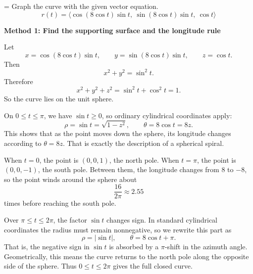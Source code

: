 \documentclass[a4paper,12pt,twocolumn]{article}
\newlength{\problemnumberwidth}
\newenvironment{solutionbox}{\begin{framed}}{\end{framed}}
\newcommand{\problem}[3]{%
  \Needspace{10\baselineskip}%
  \phantomsection\label{#1}%
  \par\vspace{0.8em}%
  \noindent
  \hangindent=\problemnumberwidth
  \hangafter=1
  \makebox[\problemnumberwidth][l]{\textbf{#2.}}#3\par
}
\begin{document}
\problem{prob:13-1-44}{44}{Graph the curve with the given vector equation.
\[
r(t)=\langle \cos(8\cos t)\sin t,\ \sin(8\cos t)\sin t,\ \cos t\rangle
\]}

\begin{solutionbox}
\textbf{Method 1: Find the supporting surface and the longitude rule}

\begin{steps}
\item Let
\[
x=\cos(8\cos t)\sin t,\qquad
y=\sin(8\cos t)\sin t,\qquad
z=\cos t.
\]
Then
\[
x^2+y^2=\sin^2 t.
\]
Therefore
\[
x^2+y^2+z^2=\sin^2 t+\cos^2 t=1.
\]
So the curve lies on the unit sphere.

\item On \(0\le t\le \pi\), we have \(\sin t\ge 0\), so ordinary cylindrical coordinates apply:
\[
\rho=\sin t=\sqrt{1-z^2},
\qquad
\theta=8\cos t=8z.
\]
This shows that as the point moves down the sphere, its longitude changes according to \(\theta=8z\). That is exactly the description of a spherical spiral.

\item When \(t=0\), the point is \((0,0,1)\), the north pole. When \(t=\pi\), the point is \((0,0,-1)\), the south pole. Between them, the longitude changes from \(8\) to \(-8\), so the point winds around the sphere about
\[
\frac{16}{2\pi}\approx 2.55
\]
times before reaching the south pole.

\item Over \(\pi\le t\le 2\pi\), the factor \(\sin t\) changes sign. In standard cylindrical coordinates the radius must remain nonnegative, so we rewrite this part as
\[
\rho=|\sin t|,\qquad \theta=8\cos t+\pi.
\]
That is, the negative sign in \(\sin t\) is absorbed by a \(\pi\)-shift in the azimuth angle. Geometrically, this means the curve returns to the north pole along the opposite side of the sphere. Thus \(0\le t\le 2\pi\) gives the full closed curve.
\end{steps}
\end{solutionbox}
\end{document}
